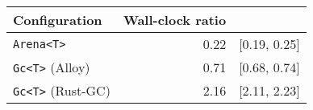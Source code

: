 \begin{tabular}{lrr}
\toprule
    Configuration & Wall-clock ratio & \\
\midrule
\texttt{Arena<T>}          & 0.22 & \scriptsize\textcolor{gray!60}{[0.19, 0.25]} \\
\addlinespace[0.8ex]
\texttt{Gc<T>} (Alloy)     & 0.71 & \scriptsize\textcolor{gray!60}{[0.68, 0.74]} \\
\addlinespace[0.8ex]
\texttt{Gc<T>} (Rust-GC)   & 2.16 & \scriptsize\textcolor{gray!60}{[2.11, 2.23]} \\
\bottomrule
\end{tabular}

